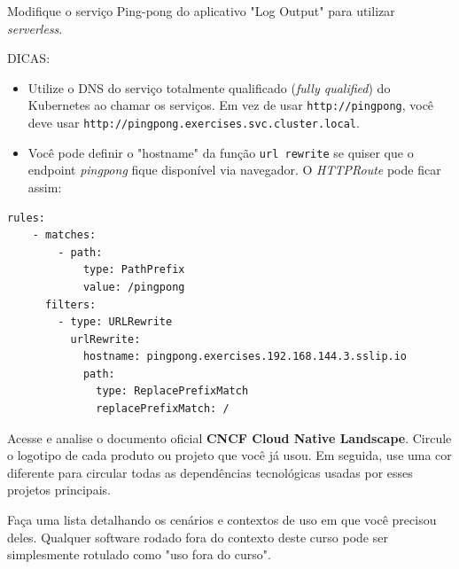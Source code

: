 \documentclass[11pt,a4paper]{article}
\begin{document}
\begin{tcolorbox}[colback=blue!5!white,colframe=blue!75!black,title=Exercício 5.7: Faça o deploy para o serverless]
Modifique o serviço Ping-pong do aplicativo "Log Output" para utilizar \textit{serverless}.

DICAS:
\begin{itemize}
    \item Utilize o DNS do serviço totalmente qualificado (\textit{fully qualified}) do Kubernetes ao chamar os serviços. Em vez de usar \texttt{http://pingpong}, você deve usar \texttt{http://pingpong.exercises.svc.cluster.local}.
    \item Você pode definir o "hostname" da função \texttt{url rewrite} se quiser que o endpoint \textit{pingpong} fique disponível via navegador. O \textit{HTTPRoute} pode ficar assim:
\end{itemize}

\begin{lstlisting}[language=bash]
  rules:
    - matches:
        - path:
            type: PathPrefix
            value: /pingpong
      filters:
        - type: URLRewrite
          urlRewrite:
            hostname: pingpong.exercises.192.168.144.3.sslip.io
            path:
              type: ReplacePrefixMatch
              replacePrefixMatch: /
\end{lstlisting}
\end{tcolorbox}

\begin{tcolorbox}[colback=blue!5!white,colframe=blue!75!black,title=Exercício 5.8: O Panorama (Landscape)]
Acesse e analise o documento oficial \textbf{CNCF Cloud Native Landscape}. Circule o logotipo de cada produto ou projeto que você já usou. Em seguida, use uma cor diferente para circular todas as dependências tecnológicas usadas por esses projetos principais. 

Faça uma lista detalhando os cenários e contextos de uso em que você precisou deles. Qualquer software rodado fora do contexto deste curso pode ser simplesmente rotulado como "uso fora do curso".
\end{tcolorbox}
\end{document}
